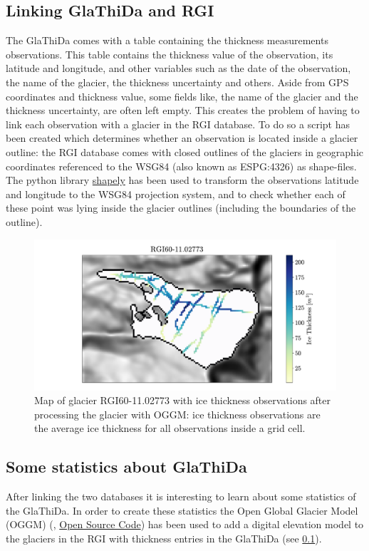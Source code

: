 \subsection{Linking GlaThiDa and RGI}\label{GlaRGI}
The GlaThiDa comes with a table containing the thickness measurements observations. This table contains the thickness value of the observation, its latitude and longitude, and other variables such as the date of the observation, the name of the glacier, the thickness uncertainty and others. Aside from GPS coordinates and thickness value, some fields like, the name of the glacier and the thickness uncertainty, are often left empty. This creates the problem of having to link each observation with a glacier in the RGI database. To do so a script has been created which determines whether an observation is located inside a glacier outline: the RGI database comes with closed outlines of the glaciers in geographic coordinates referenced to the WSG84 (also known as ESPG:4326) as shape-files. The python library \href{https://github.com/Toblerity/Shapely}{shapely} has been used to transform the observations latitude and longitude to the WSG84 projection system, and to check whether each of these point was lying inside the glacier outlines (including the boundaries of the outline).

\begin{figure}\label{fig:thickness-pt} 
	\centering 
	\includegraphics[width=1.0\textwidth]{./figures/glathida_thick_map.pdf}
	\caption{Map of glacier RGI60-11.02773 with ice thickness observations after processing the glacier with OGGM: ice thickness observations are the average ice thickness for all observations inside a grid cell.}
\end{figure}

\subsection{Some statistics about GlaThiDa}
After linking the two databases it is interesting to learn about some statistics of the GlaThiDa. In order to create these statistics the Open Global Glacier Model (OGGM) (\citet{OGGM2019}, \href{https://github.com/OGGM/oggm}{Open Source Code}) has been used to add a digital elevation model to the glaciers in the RGI with thickness entries in the GlaThiDa (see \ref{GlaRGI}).

